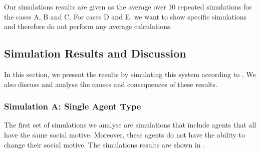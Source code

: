 Our simulations results are given as the average over 10 repeated simulations for the cases A, B and C. For cases D and E, we want to show specific simulations and therefore do not perform any average calculations.

\subsection{Simulation Results and Discussion}\label{simulation_results_sub}



In this section, we present the results by simulating this system according to . We also discuss and analyse the causes and consequences of these results.


\subsubsection{Simulation A: Single Agent Type} \label{sec:simA}

The first set of simulations we analyse are simulations that include agents that all have the same social motive. Moreover, these agents do not have the ability to change their social motive. The simulations results are shown in .

